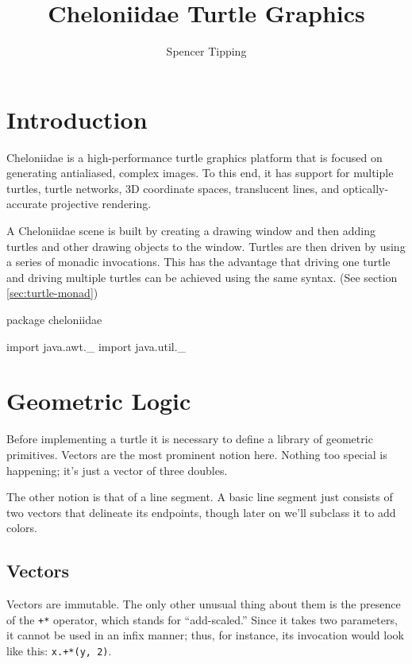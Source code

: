 \documentclass{article}
\title{Cheloniidae Turtle Graphics}
\author{Spencer Tipping}
\begin{document}
  \maketitle

  \tableofcontents

  \section{Introduction}
    \label{sec:introduction}

    Cheloniidae is a high-performance turtle graphics platform that is focused on generating antialiased, complex images. To this end, it has support for
    multiple turtles, turtle networks, 3D coordinate spaces, translucent lines, and optically-accurate projective rendering.

    A Cheloniidae scene is built by creating a drawing window and then adding turtles and other drawing objects to the window. Turtles are then driven by using
    a series of monadic invocations. This has the advantage that driving one turtle and driving multiple turtles can be achieved using the same syntax. (See
    section \ref{sec:turtle-monad})

    \begin{scalacode}
package cheloniidae

import java.awt._
import java.util._
    \end{scalacode}

  \section{Geometric Logic}
    \label{sec:geometric-logic}

    Before implementing a turtle it is necessary to define a library of geometric primitives. Vectors are the most prominent notion here. Nothing too special is
    happening; it's just a vector of three doubles.

    The other notion is that of a line segment. A basic line segment just consists of two vectors that delineate its endpoints, though later on we'll subclass
    it to add colors.

    \subsection{Vectors}
      \label{sec:vectors}

      Vectors are immutable. The only other unusual thing about them is the presence of the {\tt +*} operator, which stands for ``add-scaled.'' Since it takes
      two parameters, it cannot be used in an infix manner; thus, for instance, its invocation would look like this: {\tt x.+*(y, 2)}.
\end{document}
